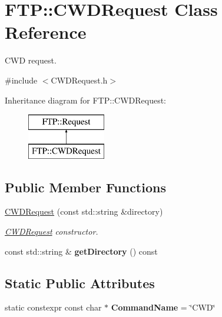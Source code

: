 \hypertarget{classFTP_1_1CWDRequest}{}\section{F\+T\+P\+:\+:C\+W\+D\+Request Class Reference}
\label{classFTP_1_1CWDRequest}


C\+W\+D request.  




{\ttfamily \#include $<$C\+W\+D\+Request.\+h$>$}

Inheritance diagram for F\+T\+P\+:\+:C\+W\+D\+Request\+:\begin{figure}[H]
\begin{center}
\leavevmode
\includegraphics[height=2.000000cm]{classFTP_1_1CWDRequest}
\end{center}
\end{figure}
\subsection*{Public Member Functions}
\begin{DoxyCompactItemize}
\item 
\hyperlink{classFTP_1_1CWDRequest_a091feea182bab2dd9a7b4fd5d4d3decc}{C\+W\+D\+Request} (const std\+::string \&directory)
\begin{DoxyCompactList}\small\item\em \hyperlink{classFTP_1_1CWDRequest}{C\+W\+D\+Request} constructor. \end{DoxyCompactList}\item 
\hypertarget{classFTP_1_1CWDRequest_a1206a80f13f5690af449ddc409bbee95}{}const std\+::string \& {\bfseries get\+Directory} () const \label{classFTP_1_1CWDRequest_a1206a80f13f5690af449ddc409bbee95}

\end{DoxyCompactItemize}
\subsection*{Static Public Attributes}
\begin{DoxyCompactItemize}
\item 
\hypertarget{classFTP_1_1CWDRequest_a9985962b0f7a8b28c49020d37e509b7d}{}static constexpr const char $\ast$ {\bfseries Command\+Name} = \char`\"{}C\+W\+D\char`\"{}\label{classFTP_1_1CWDRequest_a9985962b0f7a8b28c49020d37e509b7d}

\end{DoxyCompactItemize}


